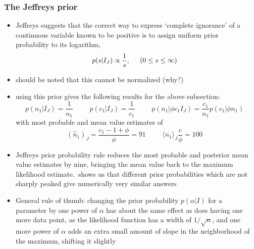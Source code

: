 \documentclass[../jaynes_prob_theory_notes.tex]{subfiles}
\begin{document}
    \subsubsection{The Jeffreys prior}
        \begin{itemize}
            \item Jeffreys suggests that the correct way to express `complete ignorance' of a continuous variable known to be positive is to assign uniform prior probability to its logarithm, 
                \begin{equation}
                    \label{jeff_prior}
                    p(s|I_J) \propto \frac{1}{s}, \hspace{0.5cm} (0 \leq s \leq \infty)
                \end{equation}
            \item should be noted that this cannot be normalized (why?)
            \item using this prior gives the following results for the above subsection:
                \begin{equation*}
                    p(n_1|I_J) = \frac{1}{n_1} \hspace{1cm} p(c_1|I_J) = \frac{1}{c_1} \hspace{1cm} p(n_1|{\phi}c_{1}I_J) = \frac{c_1}{n_1} p(c_1|{\phi}n_1)
                \end{equation*}
                with most probable and mean value estimates of 
                \begin{equation*}
                    {(\hat{n}_1)}_J = \frac{c_1 - 1 + \phi}{\phi} = 91 \hspace{1cm} {\langle n_1 \rangle}_J \frac{c}{\phi} = 100
                \end{equation*}
            \item Jeffreys prior probability rule reduces the most probable and posterior mean value estimates by nine, bringing the mean value back to the maximum likelihood estimate.\ shows us that different prior probabilities which are not sharply peaked give numerically very similar answers 
            \item General rule of thumb: changing the prior probability $p(\alpha|I)$ for a parameter by one power of $\alpha$ has about the same effect as does having one more data point, as the likelihood function has a width of $1/\sqrt{n}$, and one more power of $\alpha$ adds an extra small amount of slope in the neighborhood of the maximum, shifting it slightly
        \end{itemize}
\end{document}
